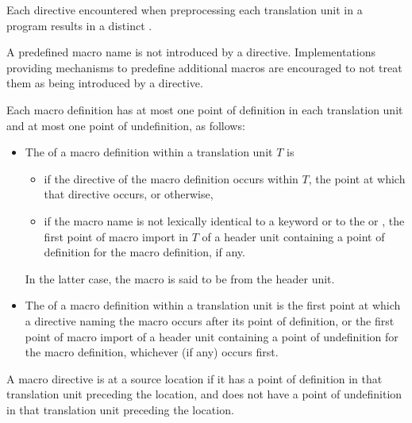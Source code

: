 \pnum
Each  directive encountered when preprocessing
each translation unit in a program results in a distinct
.
\begin{note}
A predefined macro name
is not introduced by a  directive.
Implementations providing mechanisms to predefine additional macros
are encouraged to not treat them
as being introduced by a  directive.
\end{note}
Each macro definition has at most one point of definition in
each translation unit and at most one point of undefinition, as follows:
\begin{itemize}
\item
{}%
The 
of a macro definition within a translation unit $T$ is
\begin{itemize}
\item
if the  directive of the macro definition occurs within $T$,
the point at which that directive occurs, or otherwise,
\item
if the macro name is not lexically identical to a keyword
or to the   or ,
the first point of macro import in $T$ of a header unit
containing a point of definition for the macro definition, if any.
\end{itemize}
In the latter case, the macro is said
to be  from the header unit.

\item
{}%
The 
of a macro definition within a translation unit
is the first point at which a  directive naming the macro occurs
after its point of definition, or the first point
of macro import of a header unit containing a point of undefinition for the
macro definition, whichever (if any) occurs first.
\end{itemize}

\pnum
{}%
A macro directive is  at a source location
if it has a point of definition in that translation unit preceding the location,
and does not have a point of undefinition in that translation unit preceding
the location.

